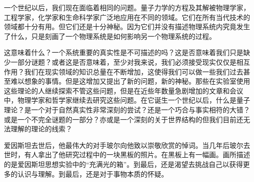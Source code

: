   一个世纪以后，我们现在面临着相同的问题。量子力学的方程及其解被物理学家，工程学家，化学家和生命科学家广泛地应用在不同的领域。它们在所有当代技术的领域都十分有用。但它们还是十分神秘。因为它们并没有描述物理系统内究竟发生了什么，只是刻画了一个物理系统是如何影响另一个物理系统的过程。

  这意味着什么？一个系统重要的真实性是不可描述的吗？这是否意味着我们只是缺少一部分谜题？或者这是否意味着，至少对我来说，我们必须接受现实仅仅是相互作用？我们在现实领域的知识总量在不断增加，这使得我们可以做一些我们过去甚至难以想象的事情。但是这增加又提出了新的问题，新的神秘。那些在实验室使用这些理论的人继续探索不管这些问题，但是在近些年数量急剧增加的文章和会议中，物理学家和哲学家继续去研究这些问题。在它诞生一个世纪以后，什么是量子理论？是一个对于自然真实性非常深刻的尝试？还是一个巧合与事实相符的大错？或是一个不完全谜题的一部分？亦或是一个深刻的关于世界结构的但我们目前还无法理解的理论的线索？

  爱因斯坦去世后，他最伟大的对手玻尔向他致以崇敬欣赏的悼词。当几年后玻尔去世时，有人拿出了他研究过程中的一块黑板的照片。在黑板上有一幅画。画所描述的是爱因斯坦思想实验中的“充满光的箱”。到最后，还是渴望去挑战自己以获得更多的认识与理解。到最后，还是对于事物本质的怀疑。

\noindent
